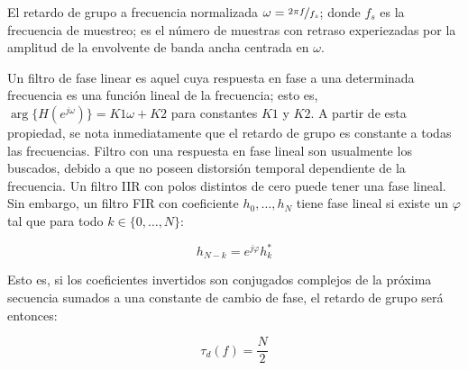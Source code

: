     El retardo de grupo a frecuencia normalizada $\omega=\nicefrac{2 \pi f}{f_s}$; donde $f_s$ es la frecuencia de muestreo; es el número de muestras con retraso experiezadas por la amplitud de la envolvente de banda ancha centrada en $\omega$.

    Un filtro de fase linear es aquel cuya respuesta en fase a una determinada frecuencia es una función lineal de la frecuencia; esto es, $\arg \{H(e^{j\omega})\}=K1\omega + K2$ para constantes $K1$ y $K2$. A partir de esta propiedad, se nota inmediatamente que el retardo de grupo es constante a todas las frecuencias. Filtro con una respuesta en fase lineal son usualmente los buscados, debido a que no poseen distorsión temporal dependiente de la frecuencia. Un filtro IIR con polos distintos de cero puede tener una fase lineal. Sin embargo, un filtro FIR con coeficiente $h_0,\ldots , h_N$ tiene fase lineal si existe un $\varphi$ tal que para todo $k \in \{0,\ldots , N\}$:

    \begin{equation}
      h_{N-k} = e^{j\varphi} h^{*}_k
      \label{eq:11}
    \end{equation}

    Esto es, si los coeficientes invertidos son conjugados complejos de la próxima secuencia sumados a una constante de cambio de fase, el retardo de grupo será entonces:

    \begin{equation}
      \tau_d (f) = \frac{N}{2}
    \end{equation}

